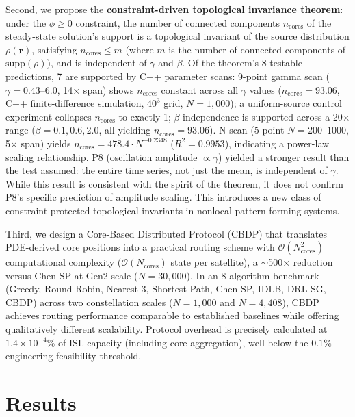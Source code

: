 \documentclass[sn-nature,pdflatex]{sn-jnl}
\begin{document}
Second, we propose the \textbf{constraint-driven topological invariance theorem}: under the $\phi \ge 0$ constraint, the number of connected components $n_{\text{cores}}$ of the steady-state solution's support is a topological invariant of the source distribution $\rho(\mathbf{r})$, satisfying $n_{\text{cores}} \le m$ (where $m$ is the number of connected components of $\text{supp}(\rho)$), and is independent of $\gamma$ and $\beta$.
Of the theorem's 8 testable predictions, 7 are supported by C++ parameter scans:
9-point gamma scan ($\gamma=0.43$--$6.0$, 14$\times$ span) shows $n_{\text{cores}}$ constant across all $\gamma$ values ($n_{\text{cores}} = 93.06$, C++ finite-difference simulation, $40^3$ grid, $N=1,000$);
a uniform-source control experiment collapses $n_{\text{cores}}$ to exactly 1;
$\beta$-independence is supported across a 20$\times$ range ($\beta=0.1, 0.6, 2.0$, all yielding $n_{\text{cores}} = 93.06$).
N-scan (5-point $N=200$--$1000$, 5$\times$ span) yields $n_{\text{cores}} = 478.4 \cdot N^{-0.2348}$ ($R^2=0.9953$), indicating a power-law scaling relationship.
P8 (oscillation amplitude $\propto \gamma$) yielded a stronger result than the test assumed: the entire time series, not just the mean, is independent of $\gamma$. While this result is consistent with the spirit of the theorem, it does not confirm P8's specific prediction of amplitude scaling.
This introduces a new class of constraint-protected topological invariants in nonlocal pattern-forming systems.

Third, we design a Core-Based Distributed Protocol (CBDP) that translates PDE-derived core positions into a practical routing scheme with $\mathcal{O}(N_{\text{cores}}^2)$ computational complexity ($\mathcal{O}(N_{\text{cores}})$ state per satellite), a $\sim$500$\times$ reduction versus Chen-SP at Gen2 scale ($N=30,000$).
In an 8-algorithm benchmark (Greedy, Round-Robin, Nearest-3, Shortest-Path, Chen-SP, IDLB, DRL-SG, CBDP) across two constellation scales ($N=1,000$ and $N=4,408$), CBDP achieves routing performance comparable to established baselines while offering qualitatively different scalability.
Protocol overhead is precisely calculated at $1.4 \times 10^{-4}\%$ of ISL capacity (including core aggregation), well below the $0.1\%$ engineering feasibility threshold.

\section{Results}
\label{sec:results}
\end{document}
